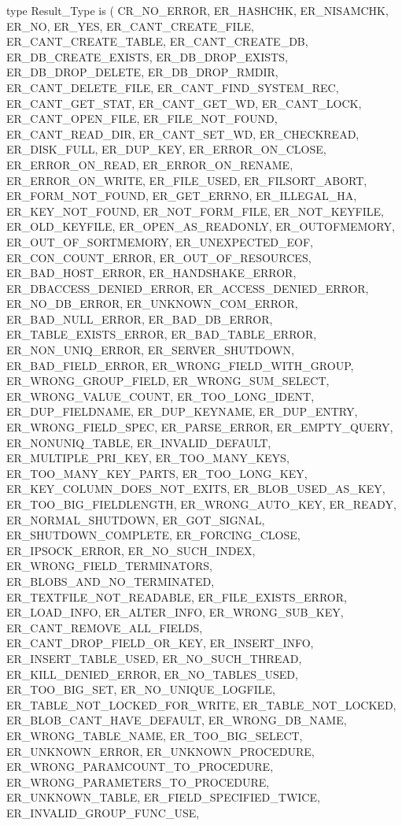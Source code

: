 \documentclass[english,letterpaper]{book}
\begin{document}
\begin{Code}
type Result_Type is (
   CR_NO_ERROR,
   ER_HASHCHK,
   ER_NISAMCHK,
   ER_NO,
   ER_YES,
   ER_CANT_CREATE_FILE,
   ER_CANT_CREATE_TABLE,
   ER_CANT_CREATE_DB,
   ER_DB_CREATE_EXISTS,
   ER_DB_DROP_EXISTS,
   ER_DB_DROP_DELETE,
   ER_DB_DROP_RMDIR,
   ER_CANT_DELETE_FILE,
   ER_CANT_FIND_SYSTEM_REC,
   ER_CANT_GET_STAT,
   ER_CANT_GET_WD,
   ER_CANT_LOCK,
   ER_CANT_OPEN_FILE,
   ER_FILE_NOT_FOUND,
   ER_CANT_READ_DIR,
   ER_CANT_SET_WD,
   ER_CHECKREAD,
   ER_DISK_FULL,
   ER_DUP_KEY,
   ER_ERROR_ON_CLOSE,
   ER_ERROR_ON_READ,
   ER_ERROR_ON_RENAME,
   ER_ERROR_ON_WRITE,
   ER_FILE_USED,
   ER_FILSORT_ABORT,
   ER_FORM_NOT_FOUND,
   ER_GET_ERRNO,
   ER_ILLEGAL_HA,
   ER_KEY_NOT_FOUND,
   ER_NOT_FORM_FILE,
   ER_NOT_KEYFILE,
   ER_OLD_KEYFILE,
   ER_OPEN_AS_READONLY,
   ER_OUTOFMEMORY,
   ER_OUT_OF_SORTMEMORY,
   ER_UNEXPECTED_EOF,
   ER_CON_COUNT_ERROR,
   ER_OUT_OF_RESOURCES,
   ER_BAD_HOST_ERROR,
   ER_HANDSHAKE_ERROR,
   ER_DBACCESS_DENIED_ERROR,
   ER_ACCESS_DENIED_ERROR,
   ER_NO_DB_ERROR,
   ER_UNKNOWN_COM_ERROR,
   ER_BAD_NULL_ERROR,
   ER_BAD_DB_ERROR,
   ER_TABLE_EXISTS_ERROR,
   ER_BAD_TABLE_ERROR,
   ER_NON_UNIQ_ERROR,
   ER_SERVER_SHUTDOWN,
   ER_BAD_FIELD_ERROR,
   ER_WRONG_FIELD_WITH_GROUP,
   ER_WRONG_GROUP_FIELD,
   ER_WRONG_SUM_SELECT,
   ER_WRONG_VALUE_COUNT,
   ER_TOO_LONG_IDENT,
   ER_DUP_FIELDNAME,
   ER_DUP_KEYNAME,
   ER_DUP_ENTRY,
   ER_WRONG_FIELD_SPEC,
   ER_PARSE_ERROR,
   ER_EMPTY_QUERY,
   ER_NONUNIQ_TABLE,
   ER_INVALID_DEFAULT,
   ER_MULTIPLE_PRI_KEY,
   ER_TOO_MANY_KEYS,
   ER_TOO_MANY_KEY_PARTS,
   ER_TOO_LONG_KEY,
   ER_KEY_COLUMN_DOES_NOT_EXITS,
   ER_BLOB_USED_AS_KEY,
   ER_TOO_BIG_FIELDLENGTH,
   ER_WRONG_AUTO_KEY,
   ER_READY,
   ER_NORMAL_SHUTDOWN,
   ER_GOT_SIGNAL,
   ER_SHUTDOWN_COMPLETE,
   ER_FORCING_CLOSE,
   ER_IPSOCK_ERROR,
   ER_NO_SUCH_INDEX,
   ER_WRONG_FIELD_TERMINATORS,
   ER_BLOBS_AND_NO_TERMINATED,
   ER_TEXTFILE_NOT_READABLE,
   ER_FILE_EXISTS_ERROR,
   ER_LOAD_INFO,
   ER_ALTER_INFO,
   ER_WRONG_SUB_KEY,
   ER_CANT_REMOVE_ALL_FIELDS,
   ER_CANT_DROP_FIELD_OR_KEY,
   ER_INSERT_INFO,
   ER_INSERT_TABLE_USED,
   ER_NO_SUCH_THREAD,
   ER_KILL_DENIED_ERROR,
   ER_NO_TABLES_USED,
   ER_TOO_BIG_SET,
   ER_NO_UNIQUE_LOGFILE,
   ER_TABLE_NOT_LOCKED_FOR_WRITE,
   ER_TABLE_NOT_LOCKED,
   ER_BLOB_CANT_HAVE_DEFAULT,
   ER_WRONG_DB_NAME,
   ER_WRONG_TABLE_NAME,
   ER_TOO_BIG_SELECT,
   ER_UNKNOWN_ERROR,
   ER_UNKNOWN_PROCEDURE,
   ER_WRONG_PARAMCOUNT_TO_PROCEDURE,
   ER_WRONG_PARAMETERS_TO_PROCEDURE,
   ER_UNKNOWN_TABLE,
   ER_FIELD_SPECIFIED_TWICE,
   ER_INVALID_GROUP_FUNC_USE,

\end{Code}
\end{document}
